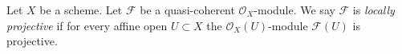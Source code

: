 \begin{definition}
\label{definition-locally-projective}
Let $X$ be a scheme. Let $\mathcal{F}$ be a quasi-coherent
$\mathcal{O}_X$-module. We say $\mathcal{F}$ is {\it locally projective}
if for every affine open $U \subset X$ the $\mathcal{O}_X(U)$-module
$\mathcal{F}(U)$ is projective.
\end{definition}